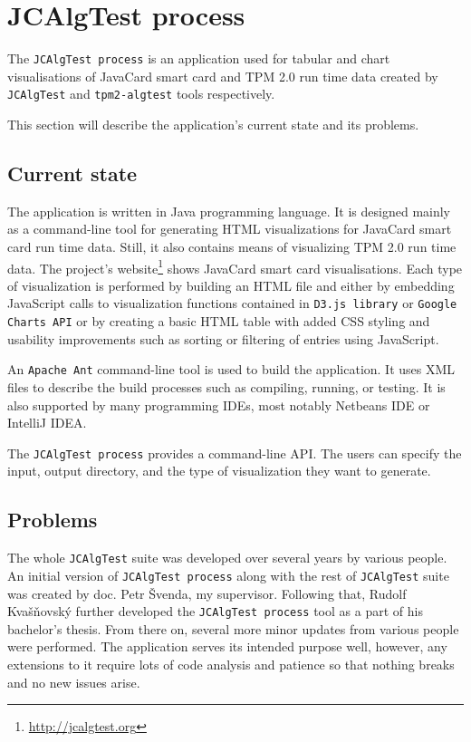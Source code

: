 \section{JCAlgTest process}
The \texttt{JCAlgTest process} is an application used for tabular and chart visualisations of JavaCard smart card and TPM 2.0 run time data created by \texttt{JCAlgTest} and \texttt{tpm2-algtest} tools respectively. 

This section will describe the application's current state and its problems.
\subsection{Current state}

The application is written in Java programming language. It is designed mainly as a command-line tool for generating HTML visualizations for JavaCard smart card run time data. Still, it also contains means of visualizing TPM 2.0 run time data. The project's website\footnote{\url{http://jcalgtest.org}} shows JavaCard smart card visualisations. Each type of visualization is performed by building an HTML file and either by embedding JavaScript calls to visualization functions contained in  \texttt{D3.js library} or \texttt{Google Charts API} or by creating a basic HTML table with added CSS styling and usability improvements such as sorting or filtering of entries using JavaScript. 

An \texttt{Apache Ant} command-line tool is used to build the application. It uses XML files to describe the build processes such as compiling, running, or testing. It is also supported by many programming IDEs, most notably Netbeans IDE or IntelliJ IDEA.

The \texttt{JCAlgTest process} provides a command-line API. The users can specify the input, output directory, and the type of visualization they want to generate.

\subsection{Problems}\label{subsec:design-problems}
The whole \texttt{JCAlgTest} suite was developed over several years by various people. An initial version of \texttt{JCAlgTest process} along with the rest of \texttt{JCAlgTest} suite was created by doc. Petr Švenda, my supervisor. Following that, Rudolf Kvašňovský further developed the \texttt{JCAlgTest process} tool as a part of his bachelor's thesis. From there on, several more minor updates from various people were performed. The application serves its intended purpose well, however, any extensions to it require lots of code analysis and patience so that nothing breaks and no new issues arise.

